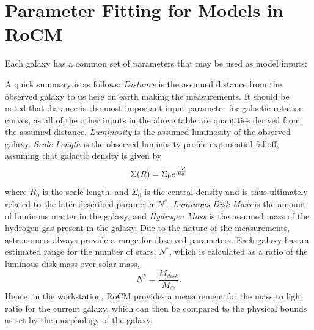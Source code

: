 \documentclass[conference]{IEEEtran-modified}
\begin{document}
\section{Parameter Fitting for Models in RoCM}
Each galaxy has a common set of parameters that may be used as model inputs: 
\begin{table}[h]
	\centering
	\normalsize
\end{table}

A quick summary is as follows: \emph{Distance} is the assumed distance from the observed galaxy to us here on earth making the measurements.  It should be noted that distance is the most important input parameter for galactic rotation curves, as all of the other inputs in the above table are quantities derived from the assumed distance. \emph{Luminosity} is the assumed luminosity of the observed galaxy.  \emph{Scale Length} is the observed luminosity profile exponential falloff, assuming that galactic density is given by 
\begin{equation}
\Sigma(R)=\Sigma_0e^{\frac{-R}{R_0}}\\
\end{equation}
where {$R_0$} is the scale length, and {$\Sigma_0$} is the central density and is thus ultimately related to the later described parameter {$N^*$}.  \emph{Luminous Disk Mass} is the amount of luminous matter in the galaxy, and \emph{Hydrogen Mass} is the assumed mass of the hydrogen gas present in the galaxy.  Due to the nature of the measurements, astronomers always provide a range for observed parameters. Each galaxy has an estimated range for the number of stars, $N^*$, which is calculated as a ratio of the luminous disk mass over solar mass,
\begin{equation}
N^* = \frac{M_{disk}}{M_{\odot}}.
\end{equation}
Hence, in the workstation, RoCM provides a measurement for the mass to light ratio for the current galaxy, which can then be compared to the physical bounds as set by the morphology of the galaxy.
\end{document}
